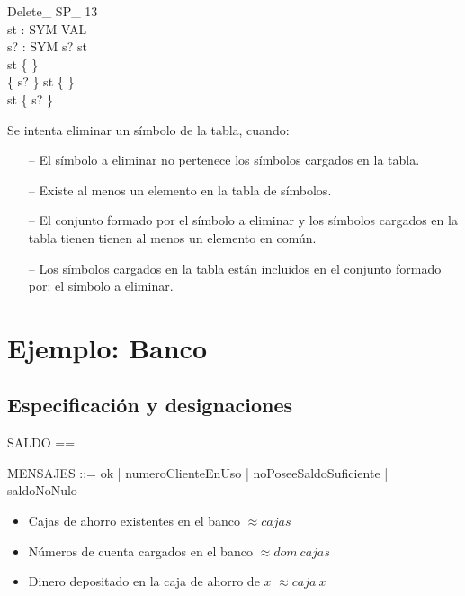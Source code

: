\begin{schema}{Delete\_ SP\_ 13}\\
 st : SYM \pfun VAL \\
 s? : SYM 
\where
 s? \notin \dom st \\
 st \neq \{ \} \\
 \{ s? \} \cap \dom st \neq \{ \} \\
 \dom st \subset \{ s? \}
\end{schema}

\begin{tcolorbox}[colback=gray!5!white,colframe=gray!50!black,
  colbacktitle=gray!75!black,title=Delete\_ SP\_ 13]
  Se intenta eliminar un símbolo de la tabla, cuando:
     \begin{itemize}
        \item[--]{El símbolo a eliminar no pertenece los símbolos cargados en la tabla.}
        \item[--]{Existe al menos un elemento en la tabla de símbolos.}
        \item[--]{El conjunto formado por el símbolo a eliminar y los símbolos cargados en la tabla tienen tienen al menos un elemento en común.}
        \item[--]{Los símbolos cargados en la tabla están incluidos en el conjunto formado por: el símbolo a eliminar.}
     \end{itemize}
\end{tcolorbox}

\section*{Ejemplo: Banco}

\subsection*{Especificación y designaciones}

\begin{zed}
[NCTA] \also

SALDO == \nat \also

MENSAJES ::= ok | numeroClienteEnUso | noPoseeSaldoSuficiente | saldoNoNulo
\end{zed}

\begin{itemize}
  \item Cajas de ahorro existentes en el banco $\approx cajas$ \\
  \item Números de cuenta cargados en el banco $\approx dom~cajas$ \\
  \item Dinero depositado en la caja de ahorro de $x$ $\approx caja~x$ 
\end{itemize}

